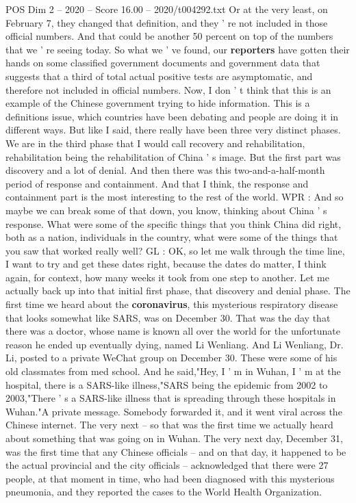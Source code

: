 \begin{textsample}{POS Dim 2 – 2020 – Score 16.00 – 2020/t004292.txt}
Or at the very least, on February 7, they changed that definition, and they ' re not included in those official numbers.
And that could be another 50 percent on top of the numbers that we ' re seeing today.
So what we ' ve found, our \textbf{reporters} have gotten their hands on some classified government documents and government data that suggests that a third of total actual positive tests are asymptomatic, and therefore not included in official numbers.
Now, I don ' t think that this is an example of the Chinese government trying to hide information.
This is a definitions issue, which countries have been debating and people are doing it in different ways.
But like I said, there really have been three very distinct phases.
We are in the third phase that I would call recovery and rehabilitation, rehabilitation being the rehabilitation of China ' s image.
But the first part was discovery and a lot of denial.
And then there was this two-and-a-half-month period of response and containment.
And that I think, the response and containment part is the most interesting to the rest of the world.
WPR : And so maybe we can break some of that down, you know, thinking about China ' s response.
What were some of the specific things that you think China did right, both as a nation, individuals in the country, what were some of the things that you saw that worked really well?
GL : OK, so let me walk through the time line, I want to try and get these dates right, because the dates do matter, I think again, for context, how many weeks it took from one step to another.
Let me actually back up into that initial first phase, that discovery and denial phase.
The first time we heard about the \textbf{coronavirus}, this mysterious respiratory disease that looks somewhat like SARS, was on December 30.
That was the day that there was a doctor, whose name is known all over the world for the unfortunate reason he ended up eventually dying, named Li Wenliang.
And Li Wenliang, Dr.
Li, posted to a private WeChat group on December 30.
These were some of his old classmates from med school.
And he said,"Hey, I ' m in Wuhan, I ' m at the hospital, there is a SARS-like illness,"SARS being the epidemic from 2002 to 2003,"There ' s a SARS-like illness that is spreading through these hospitals in Wuhan."A private message.
Somebody forwarded it, and it went viral across the Chinese internet.
The very next -- so that was the first time we actually heard about something that was going on in Wuhan.
The very next day, December 31, was the first time that any Chinese officials -- and on that day, it happened to be the actual provincial and the city officials -- acknowledged that there were 27 people, at that moment in time, who had been diagnosed with this mysterious pneumonia, and they reported the cases to the World Health Organization.

\end{textsample}
